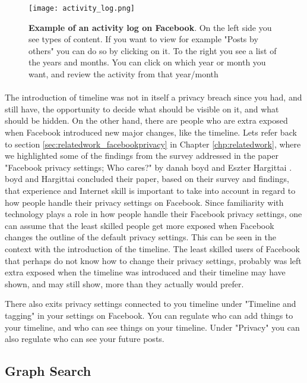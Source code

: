 \begin{figure}[h!]
\centering
\texttt{[image: activity\_log.png]}
\caption [Example of an activity log on Facebook.]{\textbf{Example of an activity log on Facebook}. On the left side you see types of content. If you want to view for example "Posts by others" you can do so by clicking on it. To the right you see a list of the years and months. You can click on which year or month you want, and review the activity from that year/month \cite{activitylog}} 
\label{fig:activitylog}
\end{figure}

\paragraph{}
The introduction of timeline was not in itself a privacy breach since you had, and still have, the opportunity to decide what should be visible on it, and what should be hidden. On the other hand, there are people who are extra exposed when Facebook introduced new major changes, like the timeline. Lets refer back to section \ref{sec:relatedwork_facebookprivacy} in Chapter \ref{chp:relatedwork}, where we highlighted some of the findings from the survey addressed in the paper "Facebook privacy settings; Who cares?" by danah boyd and Eszter Hargittai \cite{whocares}. boyd and Hargittai concluded their paper, based on their survey and findings, that experience and Internet skill is important to take into account in regard to how people handle their privacy settings on Facebook. Since familiarity with technology plays a role in how people handle their Facebook privacy settings, one can assume that the least skilled people get more exposed when Facebook changes the outline of the default privacy settings. 
This can be seen in the context with the introduction of the timeline. The least skilled users of Facebook that perhaps do not know how to change their privacy settings, probably was left extra exposed when the timeline was introduced and their timeline may have shown, and may still show, more than they actually would prefer. 

There also exits privacy settings connected to you timeline under "Timeline and tagging" in your settings on Facebook. You can regulate who can add things to your timeline, and who can see things on your timeline. Under "Privacy" you can also regulate who can see your future posts. 

\subsection{Graph Search}


